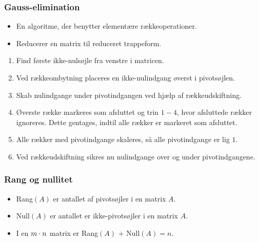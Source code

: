 \begin{frame}
\frametitle{Gauss-elimination}
\begin{itemize}
\item En algoritme, der benytter elementære rækkeoperationer. 
\item Reducerer en matrix til reduceret trappeform. 
\end{itemize}
\begin{enumerate}
\item Find første ikke-nulsøjle fra venstre i matricen.
\item Ved rækkeombytning placeres en ikke-nulindgang øverst i pivotsøjlen.
\item Skab nulindgange under pivotindgangen ved hjælp af rækkeudskiftning.
\item Øverste række markeres som afsluttet og trin $1-4$, hvor afsluttede rækker ignoreres.
Dette gentages, indtil alle rækker er markeret som afsluttet.
\item Alle rækker med pivotindgange skaleres, så alle pivotindgange er lig $1$.
\item Ved rækkeudskiftning sikres nu nulindgange over og under pivotindgangene.
\end{enumerate}
\end{frame}
\begin{frame}
\frametitle{Rang og nullitet}
\begin{itemize}
\item Rang$(A)$ er antallet af pivotsøjler i en matrix $A$. 
\item Null$(A)$ er antallet er ikke-pivotsøjler i en matrix $A$. 
\item I en $m \cross n$ matrix er Rang$(A)$ $+$ Null$(A) = n$. 
\end{itemize}
\end{frame}